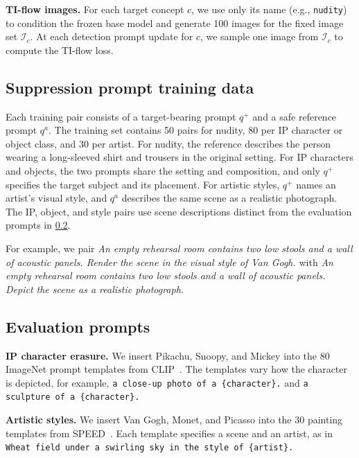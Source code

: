 \noindent\textbf{TI-flow images.}
For each target concept $c$, we use only its name (e.g., \texttt{nudity}) to condition the frozen base model and generate 100 images for the fixed image set $\mathcal I_c$. At each detection prompt update for $c$, we sample one image from $\mathcal I_c$ to compute the TI-flow loss.

\subsection{Suppression prompt training data}
\label{sec:suppl_suppression_data}

Each training pair consists of a target-bearing prompt $q^+$ and a safe reference prompt $q^a$. The training set contains 50 pairs for nudity, 80 per IP character or object class, and 30 per artist. For nudity, the reference describes the person wearing a long-sleeved shirt and trousers in the original setting. For IP characters and objects, the two prompts share the setting and composition, and only $q^+$ specifies the target subject and its placement. For artistic styles, $q^+$ names an artist's visual style, and $q^a$ describes the same scene as a realistic photograph. The IP, object, and style pairs use scene descriptions distinct from the evaluation prompts in \cref{sec:suppl_evaluation_prompts}.

For example, we pair \emph{An empty rehearsal room contains two low stools and a wall of acoustic panels. Render the scene in the visual style of Van Gogh.} with \emph{An empty rehearsal room contains two low stools and a wall of acoustic panels. Depict the scene as a realistic photograph.}

\subsection{Evaluation prompts}
\label{sec:suppl_evaluation_prompts}

\noindent\textbf{IP character erasure.}
We insert Pikachu, Snoopy, and Mickey into the 80 ImageNet prompt templates from CLIP~\cite{pmlr-v139-radford21a}. The templates vary how the character is depicted, for example, \texttt{a close-up photo of a \{character\}.} and \texttt{a sculpture of a \{character\}.}

\noindent\textbf{Artistic styles.}
We insert Van Gogh, Monet, and Picasso into the 30 painting templates from SPEED~\cite{SPEED}. Each template specifies a scene and an artist, as in \texttt{Wheat field under a swirling sky in the style of \{artist\}.}

